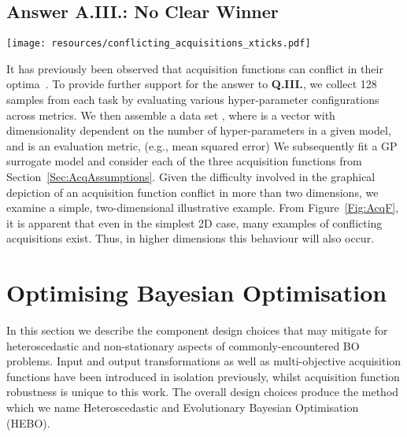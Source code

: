 \documentclass[jair,twoside,11pt,theapa]{article}
\let\cite\shortcite
\theoremstyle{definition}
\begin{document}
\subsection{Answer A.III.: No Clear Winner}\label{Sec:AnswerQ3}
\begin{figure*}
    \centering
\texttt{[image: resources/conflicting\_acquisitions\_xticks.pdf]}
    \caption{Examples depicting conflicting acquisitions across data sets (Wine, Boston Housing, and Iris) and models (AdaBoost, Multilayer perceptron, K-Nearest neighbours, and support vector machines). The y-axis shows the acquisition value, and x-axis a given configuration of hyperparameters. Clearly, in these examples, not only different acquisitions lead to different optima, but it can be seen that such solutions might conflict (minimum value for one acquisition function is a maximum value for another acquisition function).}
    \label{Fig:AcqF}
\end{figure*}
It has previously been observed that acquisition functions can conflict in their optima~\cite{2014_Shahriari}. To provide further support for the answer to \textbf{Q.III.}, we collect 128 samples from each task by evaluating various hyper-parameter configurations across metrics. We then assemble a data set , where  is a vector with dimensionality dependent on the number of hyper-parameters in a given model, and  is an evaluation metric, (e.g., mean squared error) We subsequently fit a GP surrogate model and consider each of the three acquisition functions from Section~\ref{Sec:AcqAssumptions}. Given the difficulty involved in the graphical depiction of an acquisition function conflict in more than two dimensions, we examine a simple, two-dimensional illustrative example.
From Figure~\ref{Fig:AcqF}, it is apparent that even in the simplest 2D case, many examples of conflicting acquisitions exist. Thus, in higher dimensions this behaviour will also occur. 


\section{Optimising Bayesian Optimisation}\label{Sec:Improve}
In this section we describe the component design choices that may mitigate for heteroscedastic and non-stationary aspects of commonly-encountered BO problems. Input and output transformations as well as multi-objective acquisition functions have been introduced in isolation previously, whilst acquisition function robustness is unique to this work. The overall design choices produce the method which we name Heteroscedastic and Evolutionary Bayesian Optimisation (HEBO).
\end{document}
